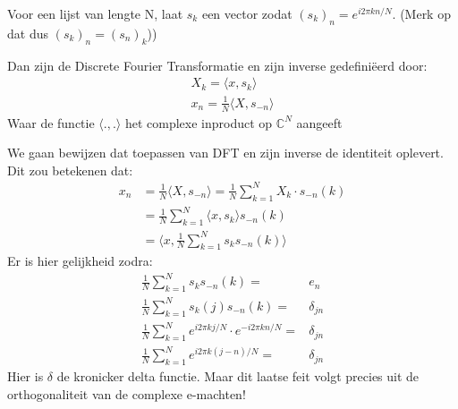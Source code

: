 \documentclass[11pt]{article}
\newcommand{\C}{\mathbb{C}}
\newcommand{\eq}[1]{\begin{eqnarray*} #1 \end{eqnarray*}}
\begin{document}
Voor een lijst van lengte N, laat $s_k$ een vector zodat $(s_k)_n = e^{i2\pi k n /N}$.
(Merk op dat dus $(s_k)_n = (s_n)_k$))

Dan zijn de Discrete Fourier Transformatie en zijn inverse gedefini\"eerd door:
\eq{
  X_k = \langle x, s_k \rangle \\
  x_n = \frac 1 N \langle X, s_{-n} \rangle
}
Waar de functie $\langle . , . \rangle$ het complexe inproduct op $\C^N$ aangeeft

We gaan bewijzen dat toepassen van DFT en zijn inverse de identiteit oplevert.
Dit zou betekenen dat:
\eq{
  x_n &= \frac 1 N \langle X , s_{-n} \rangle = \frac 1 N \sum_{k=1}^N X_k\cdot s_{-n}(k) \\
      &= \frac 1 N \sum_{k=1}^N \langle x , s_k \rangle s_{-n}(k) \\
      &= \langle x , \frac1N \sum_{k=1}^N s_k s_{-n}(k) \rangle
}
Er is hier gelijkheid zodra:
\eq{
  \frac1N \sum_{k=1}^N s_k s_{-n}(k) =& e_n \\
  \frac1N \sum_{k=1}^N s_k(j) s_{-n}(k) =& \delta_{jn}\\
  \frac1N \sum_{k=1}^N e^{i2\pi k j /N} \cdot e^{-i2\pi k n/N} =& \delta_{jn} \\
  \frac1N \sum_{k=1}^N e^{i2\pi k (j-n) /N} =& \delta_{jn}
}
Hier is $\delta$ de kronicker delta functie.
Maar dit laatse feit volgt precies uit de orthogonaliteit van de complexe e-machten!
\end{document}
